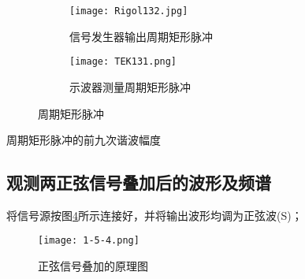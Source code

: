 \begin{enumerate}
		\begin{figure}[htpb]
			\centering
			\begin{subfigure}[htpb]{.45\linewidth}
				\centering
				\texttt{[image: Rigol132.jpg]}
				\caption{信号发生器输出周期矩形脉冲}
				\label{fig:信号发生器输出周期矩形脉冲\arabic{enumi}}
			\end{subfigure}
			\quad
			\begin{subfigure}[htpb]{.45\linewidth}
				\centering
				\texttt{[image: TEK131.png]}
				\caption{示波器测量周期矩形脉冲}
				\label{fig:示波器测量周期矩形脉冲\arabic{enumi}}
			\end{subfigure}
			\caption{周期矩形脉冲}
			\label{fig:周期矩形脉冲\arabic{enumi}}
		\end{figure}

		\begin{table}[htpb]
			\centering
			\caption{周期矩形脉冲的前九次谐波幅度}
			\label{tab:周期矩形脉冲的前九次谐波幅度\arabic{enumi}}
		\end{table}
\end{enumerate}

\subsection{观测两正弦信号叠加后的波形及频谱}%
\label{sub:观测两正弦信号叠加后的波形及频谱}

将信号源按图\ref{fig:正弦信号叠加的原理图}所示连接好，并将输出波形均调为正弦波(S)；

\begin{figure}[htpb]
	\centering
	\texttt{[image: 1-5-4.png]}
	\caption{正弦信号叠加的原理图}
	\label{fig:正弦信号叠加的原理图}
\end{figure}

